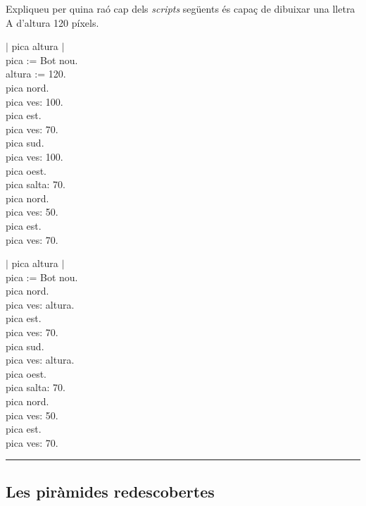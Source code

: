 \begin{center}
\colorbox{black}{}
\end{center}
{\small
\noindent
Expliqueu per quina raó cap dels \emph{scripts} següents és capaç de dibuixar una lletra A d'altura 120 píxels.}
\begin{multicols}{2}{

\noindent
\textsf{\upshape
$|$ pica altura $|$\\
pica := Bot nou.\\
altura := 120.\\
pica nord.\\
pica ves: 100.\\
pica est.\\
pica ves: 70.\\
pica sud.\\
pica ves: 100.\\
pica oest.\\
pica salta: 70.\\
pica nord.\\
pica ves: 50.\\
pica est.\\
pica ves: 70.
}
\columnbreak

\noindent
\textsf{\upshape
$|$ pica altura $|$\\
pica := Bot nou.\\
pica nord.\\
pica ves: altura.\\
pica est.\\
pica ves: 70.\\
pica sud.\\
pica ves: altura.\\
pica oest.\\
pica salta: 70.\\
pica nord.\\
pica ves: 50.\\
pica est.\\
pica ves: 70.\\
}
}
\end{multicols}

\noindent
\rule{\textwidth}{3pt}

\subsection{Les piràmides redescobertes}

